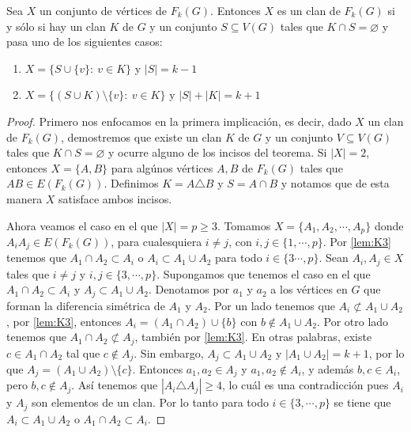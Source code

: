     \begin{teorema}
    \label{teo:clanG-clanFG}
        Sea $X$ un conjunto de v\'ertices de $F_k(G)$. Entonces $X$ es un clan
        de $F_k(G)$ si y s\'olo si hay un clan $K$ de $G$ y un conjunto $S
        \subseteq V(G)$ tales que $K \cap S = \varnothing$ y pasa uno de los
        siguientes casos:
        \begin{enumerate}
            \item $X = \{S \cup \{v\}\colon\ v \in K\}$ y $|S| = k-1$
            \item $X = \{(S\cup K) \setminus \{v\}\colon\ v \in K \}$ y $|S| + |K| =
            k+1$
        \end{enumerate}
    \end{teorema}

    \begin{proof}
        Primero nos enfocamos en la primera implicaci\'on, es decir, dado $X$ un
        clan de $F_k(G)$, demostremos que existe un clan $K$ de $G$ y un
        conjunto $V \subseteq V(G)$ tales que $K \cap S = \varnothing$ y ocurre
        alguno de los incisos del teorema. Si $|X|=2$, entonces $X= \{A, B\}$
        para alg\'unos v\'ertices $A, B$ de $F_k(G)$ tales que $AB \in
        E(F_k(G))$. Definimos $K = A \triangle B$ y $S=A \cap B$ y notamos que
        de esta manera $X$ satisface ambos incisos.

        Ahora veamos el caso en el que $|X|= p \geq 3$. Tomamos $X=\{A_1, A_2,
        \cdots, A_p\}$ donde $A_i{A_j} \in E(F_k(G))$, para cualesquiera $i\neq
        j$, con $i,j \in \{1, \cdots, p\}$. Por \cref{lem:K3} tenemos que $A_1\cap A_2 \subset A_i$ o $A_i \subset A_1 \cup
        A_2$ para todo $i \in \{3 \cdots,p \}$. Sean $A_i, A_j \in X$ tales que
        $i \neq j$ y $i, j \in \{3, \cdots, p\}$. Supongamos que tenemos el caso
        en el que $A_1\cap A_2 \subset A_i$ y $A_j \subset A_1 \cup A_2$.
        Denotamos por $a_1$ y $a_2$ a los v\'ertices en $G$ que forman la
        diferencia sim\'etrica de $A_1$ y $A_2$. Por un lado tenemos que $A_i
        \not\subset A_1\cup A_2$, por \cref{lem:K3},
        entonces $A_i = (A_1\cap A_2) \cup \{b\}$ con $b \notin A_1\cup A_2$.
        Por otro lado tenemos que $A_1 \cap A_2 \not\subset A_j$, tambi\'en por
        \cref{lem:K3}. En otras palabras, existe $c \in
        A_1 \cap A_2$ tal que $c \notin A_j$. Sin embargo, $A_j \subset A_1 \cup
        A_2$ y $|A_1 \cup A_2| =k+1$, por lo que $A_j = (A_1 \cup A_2)\setminus
        \{c\}$. Entonces $a_1, a_2 \in A_j$ y $a_1, a_2 \notin A_i$, y adem\'as
        $b, c \in A_i$, pero $b, c \notin A_j$. As\'i tenemos que $|A_i
        \triangle A_j| \geq 4$, lo cu\'al es una contradicci\'on pues $A_i$ y
        $A_j$ son elementos de un clan. Por lo tanto para todo $i\in \{3, \cdots,
        p\}$ se tiene que $A_i \subset A_1\cup A_2$ o $A_1 \cap A_2 \subset
        A_i$.


\end{proof}
